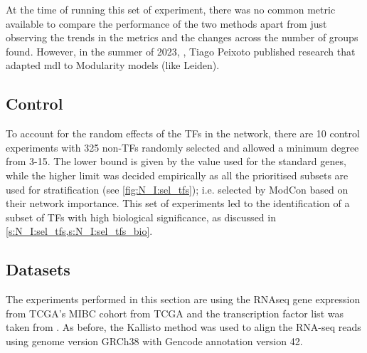 At the time of running this set of experiment, there was no common metric available to compare the performance of the two methods apart from just observing the trends in the metrics and the changes across the number of groups found. However, in the summer of 2023, \cite{Peixoto2023-mw}, Tiago Peixoto published research that adapted \acrshort{mdl} to Modularity models (like Leiden).

\subsection*{Control}

To account for the random effects of the TFs in the network, there are 10 control experiments with 325 non-TFs randomly selected and allowed a minimum degree from 3-15. The lower bound is given by the value used for the standard genes, while the higher limit was decided empirically as all the prioritised subsets are used for stratification (see \cref{fig:N_I:sel_tfs}); i.e. selected by ModCon based on their network importance. This set of experiments led to the identification of a subset of TFs with high biological significance, as discussed in \cref{s:N_I:sel_tfs,s:N_I:sel_tfs_bio}.



\subsection* {Datasets}

The experiments performed in this section are using the RNAseq gene expression from TCGA's MIBC cohort from TCGA and the transcription factor list was taken from \citet{Lambert2018-el}. As before, the Kallisto method was used to align the RNA-seq reads using genome version GRCh38 with Gencode annotation version 42. 

